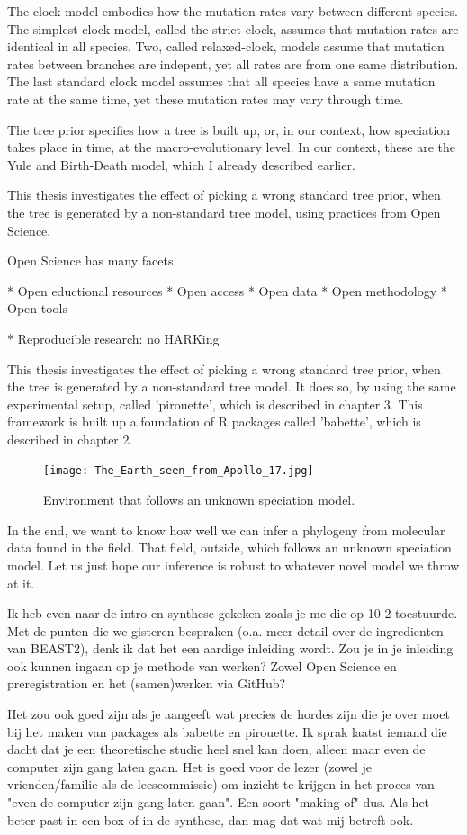 The clock model embodies how the mutation rates vary between
different species. The simplest clock model, called the strict clock,
assumes that mutation rates are identical in all species. 
Two, called relaxed-clock, models assume that mutation rates
between branches are indepent, yet all rates are from one same distribution.
The last standard clock model assumes that all species have a same mutation
rate at the same time, yet these mutation rates may vary through time.

The tree prior specifies how a tree is built up, or, in our context,
how speciation takes place in time, at the macro-evolutionary level.
In our context, these are the Yule and Birth-Death model, which I already
described earlier.

This thesis investigates the effect of picking a wrong standard
tree prior, when the tree is generated 
by a non-standard tree model, using practices from Open Science.

Open Science has many facets. 

 * Open eductional resources
 * Open access
 * Open data
 * Open methodology
 * Open tools

 * Reproducible research: no HARKing


This thesis investigates the effect of picking a wrong standard
tree prior, when the tree is generated 
by a non-standard tree model. 
It does so, by using the same experimental setup, called 'pirouette',
which is described in chapter 3. This framework is built up a foundation
of R packages called 'babette', which is described in chapter 2.

\begin{figure}[H]
  \texttt{[image: The\_Earth\_seen\_from\_Apollo\_17.jpg]}
  \caption{
    Environment that follows an unknown speciation model.
 }
  \label{fig:unknown_speciation_model}
\end{figure}

In the end, we want to know how well we can infer a phylogeny from
molecular data found in the field. That field, outside, 
which follows an unknown speciation model. Let us just hope our inference
is robust to whatever novel model we throw at it.





Ik heb even naar de intro en synthese gekeken zoals je me die op 10-2 toestuurde. 
Met de punten die we gisteren bespraken (o.a. meer detail over de ingredienten 
van BEAST2), denk ik dat het een aardige inleiding wordt. Zou je in je inleiding 
ook kunnen ingaan op je methode van werken? 
Zowel Open Science en preregistration en het (samen)werken via GitHub? 

Het zou ook goed zijn als je aangeeft wat precies de hordes zijn die je over 
moet bij het maken van packages als babette en pirouette. 
Ik sprak laatst iemand die dacht dat je een theoretische studie heel snel kan doen, 
alleen maar even de computer zijn gang laten gaan. 
Het is goed voor de lezer (zowel je vrienden/familie als de leescommissie) 
om inzicht te krijgen in het proces van "even de computer zijn gang laten gaan". 
Een soort "making of" dus. Als het beter past in een box of in de synthese, 
dan mag dat wat mij betreft ook.

